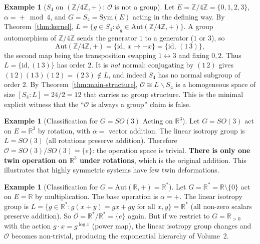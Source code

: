 \documentclass[11pt,a4paper,openany]{book}
\theoremstyle{plain}
\theoremstyle{definition}
\newtheorem{example}[theorem]{Example}
\newcommand{\opspace}{\mathcal{O}}
\newcommand{\lingroup}{L}
\newcommand{\actspace}{E}
\newcommand{\groupG}{G}
\newcommand{\RR}{\mathbb{R}}
\newcommand{\ZZ}{\mathbb{Z}}
\newcommand{\Aut}{\mathrm{Aut}}
\begin{document}
\begin{example}[$S_4$ on $(\ZZ/4\ZZ,+)$: $\opspace$ is not a group]\label{ex:s4-nonnormal}
Let $\actspace=\ZZ/4\ZZ=\{0,1,2,3\}$, $\alpha={}+\bmod 4$, and $\groupG=S_4=\mathrm{Sym}(\actspace)$ acting in the defining way. By Theorem~\ref{thm:kernel}, $\lingroup=\{g\in S_4:\phi_g\in\Aut(\ZZ/4\ZZ,+)\}$. A group automorphism of $\ZZ/4\ZZ$ sends the generator $1$ to a generator ($1$ or $3$), so
\[
\Aut(\ZZ/4\ZZ,+)=\{\mathrm{id},\ x\mapsto -x\}=\{\mathrm{id},\,(1\,3)\},
\]
the second map being the transposition swapping $1\leftrightarrow 3$ and fixing $0,2$. Thus $\lingroup=\{\mathrm{id},(1\,3)\}$ has order $2$. It is \emph{not} normal: conjugating by $(1\,2)$ gives $(1\,2)(1\,3)(1\,2)=(2\,3)\notin\lingroup$, and indeed $S_4$ has no normal subgroup of order $2$. By Theorem~\ref{thm:main-structure}, $\opspace\cong\lingroup\backslash S_4$ is a homogeneous space of size $[S_4:\lingroup]=24/2=12$ that carries no group structure. This is the minimal explicit witness that the ``$\opspace$ is always a group'' claim is false.
\end{example}



\begin{example}[Classification for $G = SO(3)$ Acting on $\RR^3$]\label{ex:so3-classification}
Let $\groupG = SO(3)$ act on $\actspace = \RR^3$ by rotation, with $\alpha = $ vector addition. The linear isotropy group is $\lingroup = SO(3)$ (all rotations preserve addition). Therefore $\opspace = SO(3)/SO(3) = \{e\}$: the operation space is trivial. \textbf{There is only one twin operation on $\RR^3$ under rotations}, which is the original addition. This illustrates that highly symmetric systems have few twin deformations.
\end{example}

\begin{example}[Classification for $G = \Aut(\RR, +) = \RR^*$]\label{ex:autR-classification}
Let $\groupG = \RR^* = \RR \setminus \{0\}$ act on $\actspace = \RR$ by multiplication. The base operation is $\alpha = +$. The linear isotropy group is $\lingroup = \{g \in \RR^* : g(x+y) = gx + gy \text{ for all } x,y\} = \RR^*$ (all non-zero scalars preserve addition). So $\opspace = \RR^*/\RR^* = \{e\}$ again. But if we restrict to $\groupG = \RR_{>0}$ with the action $g \cdot x = g^{\log x}$ (power map), the linear isotropy group changes and $\opspace$ becomes non-trivial, producing the exponential hierarchy of Volume~2.
\end{example}
\end{document}
